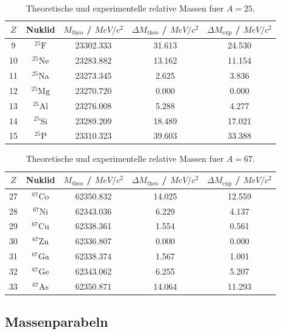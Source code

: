 \documentclass[11pt,a4paper]{scrartcl}
\newcommand{\MeV}{\si{MeV}}
\newcommand{\isotope}[2]{^{#1}\mathrm{#2}}
\theoremstyle{definition}
\theoremstyle{plain}
\theoremstyle{remark}
\begin{document}
\begin{table}[h]
\centering
\caption{Theoretische und experimentelle relative Massen fuer $A=25$.}
\begin{tabular}{c c c c c}
\toprule
$Z$ & Nuklid & $M_{\mathrm{theo}}$ / $\si{\MeV}/c^2$ & $\Delta M_{\mathrm{theo}}$ / $\si{\MeV}/c^2$ & $\Delta M_{\mathrm{exp}}$ / $\si{\MeV}/c^2$ \\
\midrule
9  & $\isotope{25}{F}$  & 23302.333 & 31.613 & 24.530 \\
10 & $\isotope{25}{Ne}$ & 23283.882 & 13.162 & 11.154 \\
11 & $\isotope{25}{Na}$ & 23273.345 &  2.625 &  3.836 \\
12 & $\isotope{25}{Mg}$ & 23270.720 &  0.000 &  0.000 \\
13 & $\isotope{25}{Al}$ & 23276.008 &  5.288 &  4.277 \\
14 & $\isotope{25}{Si}$ & 23289.209 & 18.489 & 17.021 \\
15 & $\isotope{25}{P}$  & 23310.323 & 39.603 & 33.388 \\
\bottomrule
\end{tabular}
\end{table}

\begin{table}[h]
\centering
\caption{Theoretische und experimentelle relative Massen fuer $A=67$.}
\begin{tabular}{c c c c c}
\toprule
$Z$ & Nuklid & $M_{\mathrm{theo}}$ / $\si{\MeV}/c^2$ & $\Delta M_{\mathrm{theo}}$ / $\si{\MeV}/c^2$ & $\Delta M_{\mathrm{exp}}$ / $\si{\MeV}/c^2$ \\
\midrule
27 & $\isotope{67}{Co}$ & 62350.832 & 14.025 & 12.559 \\
28 & $\isotope{67}{Ni}$ & 62343.036 &  6.229 &  4.137 \\
29 & $\isotope{67}{Cu}$ & 62338.361 &  1.554 &  0.561 \\
30 & $\isotope{67}{Zn}$ & 62336.807 &  0.000 &  0.000 \\
31 & $\isotope{67}{Ga}$ & 62338.374 &  1.567 &  1.001 \\
32 & $\isotope{67}{Ge}$ & 62343.062 &  6.255 &  5.207 \\
33 & $\isotope{67}{As}$ & 62350.871 & 14.064 & 11.293 \\
\bottomrule
\end{tabular}
\end{table}

\FloatBarrier

\subsection{Massenparabeln}
\end{document}
